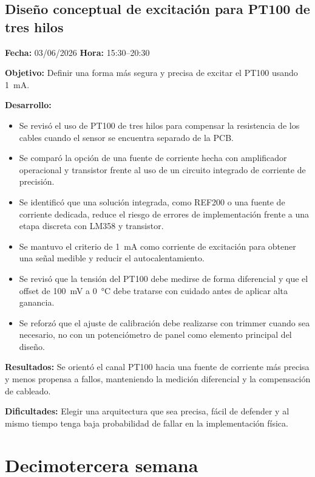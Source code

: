 \documentclass[12pt]{article}
\begin{document}
\subsection{Diseño conceptual de excitación para PT100 de tres hilos}
\textbf{Fecha:} 03/06/2026 \quad \textbf{Hora:} 15:30--20:30

\textbf{Objetivo:}
Definir una forma más segura y precisa de excitar el PT100 usando \SI{1}{mA}.

\textbf{Desarrollo:}
\begin{itemize}
\item Se revisó el uso de PT100 de tres hilos para compensar la resistencia de los cables cuando el sensor se encuentra separado de la PCB.
\item Se comparó la opción de una fuente de corriente hecha con amplificador operacional y transistor frente al uso de un circuito integrado de corriente de precisión.
\item Se identificó que una solución integrada, como REF200 o una fuente de corriente dedicada, reduce el riesgo de errores de implementación frente a una etapa discreta con LM358 y transistor.
\item Se mantuvo el criterio de \SI{1}{mA} como corriente de excitación para obtener una señal medible y reducir el autocalentamiento.
\item Se revisó que la tensión del PT100 debe medirse de forma diferencial y que el offset de \SI{100}{mV} a \SI{0}{\celsius} debe tratarse con cuidado antes de aplicar alta ganancia.
\item Se reforzó que el ajuste de calibración debe realizarse con trimmer cuando sea necesario, no con un potenciómetro de panel como elemento principal del diseño.
\end{itemize}

\textbf{Resultados:}
Se orientó el canal PT100 hacia una fuente de corriente más precisa y menos propensa a fallos, manteniendo la medición diferencial y la compensación de cableado.

\textbf{Dificultades:}
Elegir una arquitectura que sea precisa, fácil de defender y al mismo tiempo tenga baja probabilidad de fallar en la implementación física.

\section{Decimotercera semana}

\end{document}
